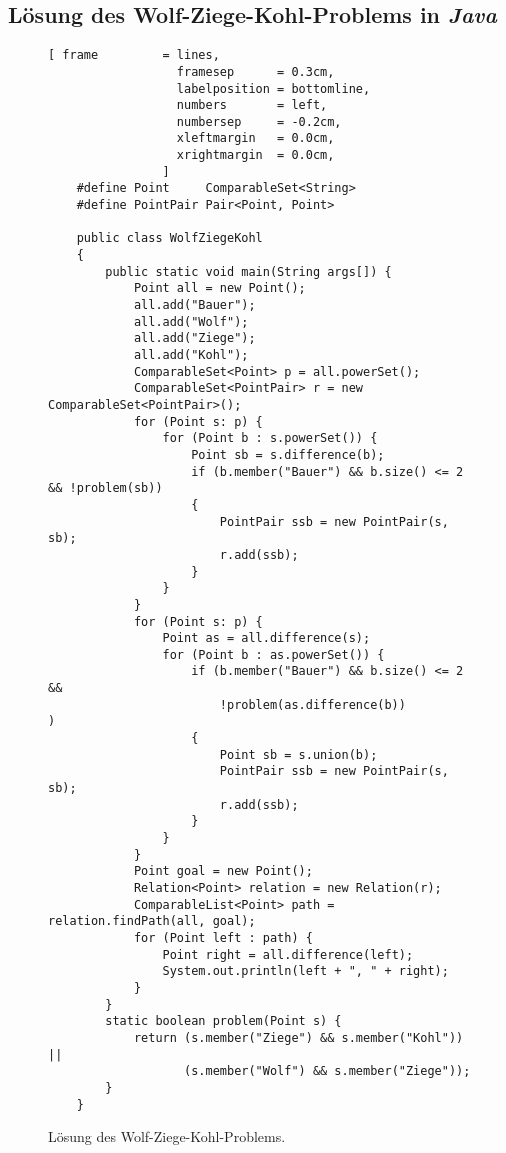 \pagebreak

\vspace*{\fill}

\pagebreak


\subsection{L\"osung des Wolf-Ziege-Kohl-Problems in \textsl{Java}}

\begin{figure}[!h]
\centering
\begin{Verbatim}[ frame         = lines, 
                  framesep      = 0.3cm, 
                  labelposition = bottomline,
                  numbers       = left,
                  numbersep     = -0.2cm,
                  xleftmargin   = 0.0cm,
                  xrightmargin  = 0.0cm,
                ]
    #define Point     ComparableSet<String>
    #define PointPair Pair<Point, Point>
    
    public class WolfZiegeKohl 
    {    
        public static void main(String args[]) {
            Point all = new Point();
            all.add("Bauer");
            all.add("Wolf");
            all.add("Ziege");
            all.add("Kohl");
            ComparableSet<Point> p = all.powerSet();
            ComparableSet<PointPair> r = new ComparableSet<PointPair>();
            for (Point s: p) {
                for (Point b : s.powerSet()) {
                    Point sb = s.difference(b);
                    if (b.member("Bauer") && b.size() <= 2 && !problem(sb)) 
                    {
                        PointPair ssb = new PointPair(s, sb);
                        r.add(ssb); 
                    }
                }
            }
            for (Point s: p) {
                Point as = all.difference(s);
                for (Point b : as.powerSet()) {
                    if (b.member("Bauer") && b.size() <= 2 && 
                        !problem(as.difference(b))           ) 
                    {
                        Point sb = s.union(b);
                        PointPair ssb = new PointPair(s, sb);
                        r.add(ssb); 
                    }
                }
            }
            Point goal = new Point();
            Relation<Point> relation = new Relation(r);
            ComparableList<Point> path = relation.findPath(all, goal);
            for (Point left : path) {
                Point right = all.difference(left);
                System.out.println(left + ", " + right);
            }
        }
        static boolean problem(Point s) {
            return (s.member("Ziege") && s.member("Kohl")) || 
                   (s.member("Wolf") && s.member("Ziege"));
        }
    }   
\end{Verbatim}
\vspace*{-0.3cm}
\caption{L\"osung des Wolf-Ziege-Kohl-Problems.}
\label{fig:WolfZiegeKohl.jpre}
\end{figure}



